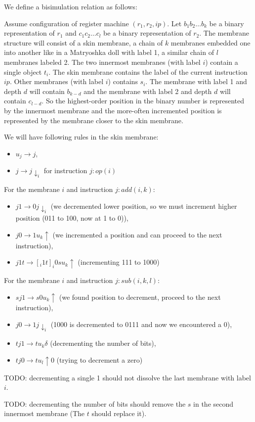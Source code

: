 \documentclass[llncs,submission,copyright,creativecommons]{../lib/lncs/llncs}
\begin{document}
We define a bisimulation relation as follows:

Assume configuration of register machine $(r_1, r_2, ip)$. Let $b_1b_2\ldots b_k$ be a binary representation of $r_1$ and $c_1c_2\ldots c_l$ be a binary representation of $r_2$. The membrane structure will consist of a skin membrane, a chain of $k$ membranes embedded one into another like in a Matryoshka doll with label 1, a similar chain of $l$ membranes labeled 2. The two innermost membranes (with label $i$) contain a single object $t_i$. The skin membrane contains the label of the current instruction $ip$. Other membranes (with label $i$) contains $s_i$.
The membrane with label 1 and depth $d$ will contain $b_{k-d}$ and the membrane with label 2 and depth $d$ will contain $c_{l-d}$. So the highest-order position in the binary number is represented by the innermost membrane and the more-often incremented position is represented by the membrane closer to the skin membrane.

We will have following rules in the skin membrane:
\begin{itemize}
  \item $u_j \rightarrow j$,
  \item $j \rightarrow j\downarrow_{i}$ for instruction $j: op(i)$
\end{itemize}

For the membrane $i$ and instruction $j: add(i,k)$:
\begin{itemize}
  \item $j1 \rightarrow 0j\downarrow_{i}$ (we decremented lower position, so we must increment higher position (011 to 100, now at 1 to 0)),
  \item $j0 \rightarrow 1u_k \uparrow$ (we incremented a position and can proceed to the next instruction),
  \item $j1t \rightarrow [_i 1t]_i0su_k\uparrow$ (incrementing 111 to 1000)
\end{itemize}

For the membrane $i$ and instruction $j: sub(i,k,l)$:
\begin{itemize}
  \item $sj1 \rightarrow s0u_k \uparrow$ (we found position to decrement, proceed to the next instruction),
  \item $j0 \rightarrow 1j\downarrow_i$ (1000 is decremented to 0111 and now we encountered a 0),
  \item $tj1 \rightarrow tu_k \delta$ (decrementing the number of bits),
  \item $tj0 \rightarrow tu_l \uparrow 0$ (trying to decrement a zero)
\end{itemize}

TODO: decrementing a single 1 should not dissolve the last membrane with label $i$.

TODO: decrementing the number of bits should remove the $s$ in the second innermost membrane (The $t$ should replace it).




\end{document}
